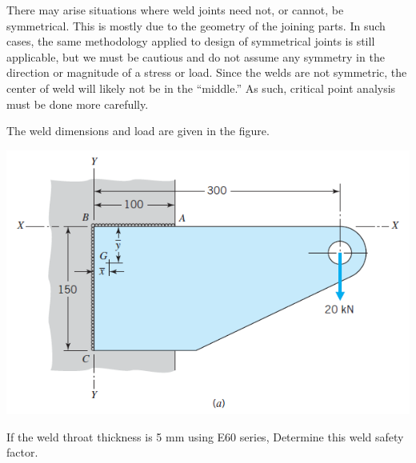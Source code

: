 \documentclass[
10pt,
a4paper,
openany,
svgnames,
]{book}
\begin{document}
There may arise situations where weld joints need not, or cannot, be symmetrical. This is mostly due to the geometry of the joining parts. In such cases, the same methodology applied to design of symmetrical joints is still applicable, but we must be cautious and do not assume any symmetry in the direction or magnitude of a stress or load. Since the welds are not symmetric, the center of weld will likely not be in the ``middle.'' As such, critical point analysis must be done more carefully.

\begin{example}
  The weld dimensions and load are given in the figure.
  \begin{center}
    \includegraphics[scale=0.55]{pictures/Welding/weld-under-torsion-and-bending}
  \end{center}
  If the weld throat thickness is 5 mm using E60 series, Determine this weld safety factor.
\end{example}
\end{document}

